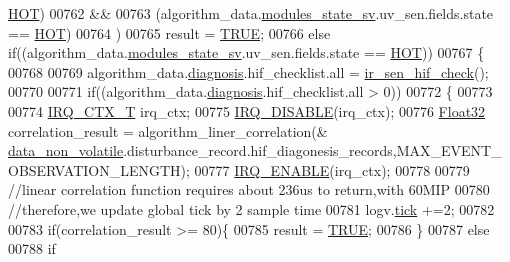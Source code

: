 \begin{DoxyCode}
{{{{{      \hyperlink{a00021_a1eb14cc432874ddacd1934791dbe12a3}{HOT})
00762                         &&
00763                         (algorithm\_data.\hyperlink{a00016_a293140e240bbd54f7601adbc9194148c}{modules\_state\_sv}.uv\_sen.fields.state == 
      \hyperlink{a00021_a1eb14cc432874ddacd1934791dbe12a3}{HOT})
00764                         )
00765                             result = \hyperlink{a00040_aa8cecfc5c5c054d2875c03e77b7be15d}{TRUE};
00766                        \textcolor{keywordflow}{else} \textcolor{keywordflow}{if}((algorithm\_data.\hyperlink{a00016_a293140e240bbd54f7601adbc9194148c}{modules\_state\_sv}.uv\_sen.fields.state == 
      \hyperlink{a00021_a1eb14cc432874ddacd1934791dbe12a3}{HOT}))
00767                        \{
00768 
00769                            algorithm\_data.\hyperlink{a00016_a16f85d57ec98b4ad05f5a2e10536b3c6}{diagnosis}.hif\_checklist.all = 
      \hyperlink{a00017_a86870a0e00601a92277e689447739ce9}{ir\_sen\_hif\_check}();
00770 
00771                            \textcolor{keywordflow}{if}((algorithm\_data.\hyperlink{a00016_a16f85d57ec98b4ad05f5a2e10536b3c6}{diagnosis}.hif\_checklist.all > 0))
00772                            \{
00773 
00774                                \hyperlink{a00033_a6d4f0a7397640f5b011ca9c39d47dc72}{IRQ\_CTX\_T}   irq\_ctx;
00775                                \hyperlink{a00033_a357168bbe78739811cdb7b5576714ca6}{IRQ\_DISABLE}(irq\_ctx);
00776                                  \hyperlink{a00072_a87d38f886e617ced2698fc55afa07637}{Float32} correlation\_result = algorithm\_liner\_correlation(&
      \hyperlink{a00060_a76ac5f917f5308dcd83de0d7c94559fb}{data\_non\_volatile}.disturbance\_record.hif\_diagonesis\_records,MAX\_EVENT\_OBSERVATION\_LENGTH);
00777                                \hyperlink{a00033_abc8e0f43382f8b0fdf60d35a93c20c57}{IRQ\_ENABLE}(irq\_ctx);
00778                                
00779                                \textcolor{comment}{//linear correlation function requires about 236us to return,with 60MIP}
00780                                \textcolor{comment}{//therefore,we update global tick by 2 sample time}
00781                                logv.\hyperlink{a00021_a81f0ce68c2c483fb8df726cc1988d8e8}{tick} +=2;
00782 
00783                                  \textcolor{keywordflow}{if}(correlation\_result >= 80)\{
00785                                      result = \hyperlink{a00040_aa8cecfc5c5c054d2875c03e77b7be15d}{TRUE};
00786                                  \}
00787                                  \textcolor{keywordflow}{else}
00788                                  \textcolor{keywordflow}{if}
}}}}}
\end{DoxyCode}
